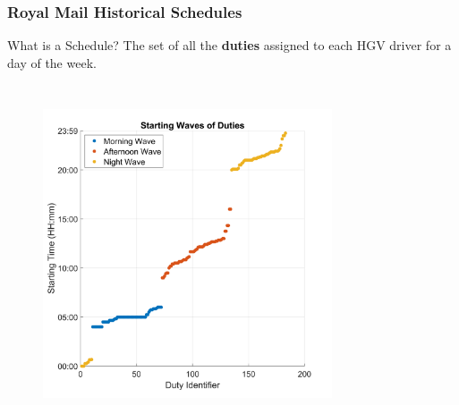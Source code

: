 \documentclass[handout]{beamer}
\begin{document}
\begin{frame}
	\frametitle{Royal Mail Historical Schedules}
	\vspace{\baselineskip}
	
    \begin{block}{What is a Schedule?}
		The set of all the \textbf{duties} assigned to each HGV driver for a day of the week.
	\end{block}
	
	\begin{columns}[b]
			\centering
		    \begin{figure}
			   \includegraphics[width=\textwidth]{Images/Appendix-Start-wave.png} \
			 \end{figure}
			\centering
	        \begin{figure}

\end{figure}
\end{columns}
\end{frame}
\end{document}
